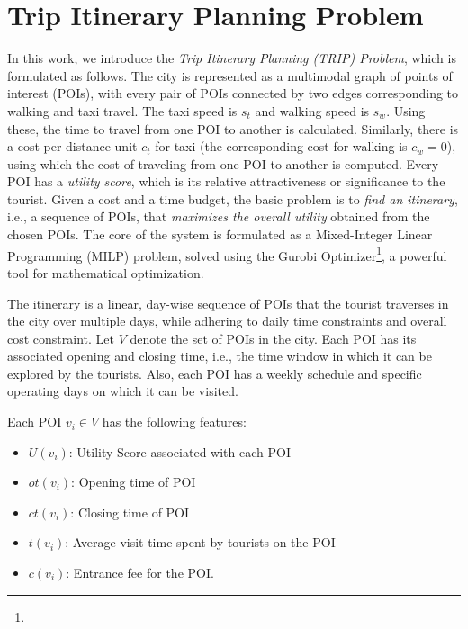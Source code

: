 \section{Trip Itinerary Planning Problem}

In this work, we introduce the \emph{Trip Itinerary Planning (TRIP) Problem}, which is formulated as follows. The city is represented as a multimodal graph of points of interest (POIs), with every pair of POIs connected by two edges corresponding to walking and taxi travel. The taxi speed is $s_t$ and walking speed is $s_w$. Using these, the time to travel from one POI to another is calculated. Similarly, there is a cost per distance unit $c_t$ for taxi (the corresponding cost for walking is $c_w = 0$), using which the cost of traveling from one POI to another is computed. Every POI has a \emph{utility score}, which is its relative attractiveness or significance to the tourist. Given a cost and a time budget, the basic problem is to \emph{find an itinerary}, i.e., a sequence of POIs, that \emph{maximizes the overall utility} obtained from the chosen POIs. The core of the system is formulated as a Mixed-Integer Linear Programming (MILP) problem, solved using the Gurobi Optimizer\footnote{}, a powerful tool for mathematical optimization.

The itinerary is a linear, day-wise sequence of POIs that the tourist traverses in the city over multiple days, while adhering to daily time constraints and overall cost constraint. Let $V$ denote the set of POIs in the city. Each POI has its associated opening and closing time, i.e., the time window in which it can be explored by the tourists. Also, each POI has a weekly schedule and specific operating days on which it can be visited.


Each POI \( v_i \in V \) has the following features:

\begin{itemize}
    \item \( U(v_i) \): Utility Score associated with each POI
    \item \( ot(v_i) \): Opening time of POI
    \item \( ct(v_i) \): Closing time of POI
    \item \( t(v_i) \): Average visit time spent by tourists on the POI
    \item \( c(v_i) \): Entrance fee for the POI.
\end{itemize}

